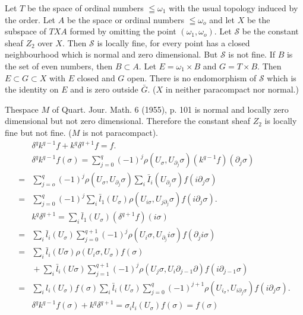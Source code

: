 \begin{exam}%
Let $T$ be the space of ordinal numbers $\leqq \omega_1$ with the
usual topology induced by the order. Let $A$ be the space or ordinal
numbers $\leqq \omega_o$ and let $X$ be the subspace of $T X A$
formed by omitting the point $(\omega_1, \omega_o)$. Let $\mathscr{S}$
be the constant sheaf $Z_2$ over $X$. Then $\mathscr{S}$ is locally
fine, for every point has a closed neighbourhood which is normal 
 and zero dimensional. But $\mathscr{S}$ is not fine. If $B$ is
the set of even numbers, then $B \subset A$. Let $E = \omega_1 \times
B$ and $G = T \times B$. Then $E \subset G \subset X$ with $E$ closed
and $G$ open. There is no endomorphism of $\mathscr{S}$ which is the
identity on $E$ and is zero outside $\bar{G}$. ($X$ in neither
paracompact nor normal.)     
\end{exam}

\begin{exam}%
The\pageoriginale space $M$ of Quart. Jour. Math. 6 (1955), p. 101 is
normal and locally zero dimensional but not zero
dimensional. Therefore the constant sheaf $Z_2$ is locally fine but
not fine. ($M$ is not paracompact).\pageoriginale    
\begin{align*}
& \delta^q k^{q-1} f+ k^q \delta^{q+1} f =f.\\
& \delta^q k^{q-1} f(\sigma)  = \sum^q_{j=0} (-1)^j \rho (U_\sigma,
  U_{\partial_j}\sigma) (k^{q-1} f) (\partial_j \sigma)\\ 
= & \sum^q_{j=o} (-1)^j \rho (U_{\sigma} ,U_{\partial_j} \sigma)
\sum_i \bar{I}_i (U_{\partial_j} \sigma) f (i \partial_j \sigma)\\ 
= & \sum^q_{j=0} (-1)^j \sum_i \bar{l}_1 (U_\sigma) \rho (U_{i
  \sigma}, U_{j \partial_j} \sigma) f (i \partial_j \sigma).\\ 
& k^q \delta^{q+1} = \sum_i \bar{l}_1 (U_\sigma) (\delta^{q+1} f) (i
\sigma)\\ 
= & \sum_i \bar{l}_i (U_\sigma) \sum^{q+1}_{j=0} (-1)^j \rho (U_i
\sigma, U_{\partial_j} i \sigma) f (\partial_j i \sigma)\\ 
= &\sum_i \bar{l}_i (U\sigma) \rho (U_i \sigma, U_\sigma) f (\sigma)\\
&{} +\sum_i \bar{l}_i (U\sigma) \sum^{q+1}_{j=1} (-1)^j \rho (U_j \sigma,
U_i \partial_{j-1} \partial) f (i\partial_{j-1} \sigma)\\ 
= & \sum_i l_i (U_\sigma) f (\sigma) \sum_i \bar{l}_i (U_\sigma)
\sum^q_{j=0} (-1)^{j+1} \rho (U_{i_\sigma}, U_{i \partial_j \sigma}) f (i
\partial_j \sigma).\\ 
& \delta^q k^{q-1} f(\sigma) + k^q \delta^{q+1} = \sigma_i l_i
(U_\sigma) f (\sigma) = f (\sigma)
\end{align*}
\end{exam}


